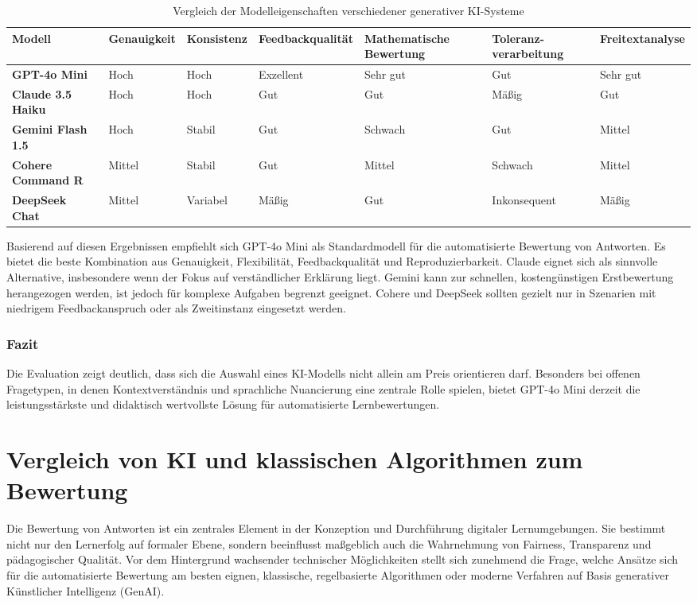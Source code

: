 \documentclass[a4paper,12pt]{article}
\begin{document}
\begin{table}[h!]
\centering
\scriptsize
\renewcommand{\arraystretch}{1.2}
\begin{tabularx}{\textwidth}{>{\bfseries}l p{1.5cm} p{1.4cm} p{2cm} p{1.8cm} p{1.7cm} p{2cm}}
\toprule
Modell & Genauigkeit & Konsistenz & Feedbackqualität & Mathematische Bewertung & Toleranz-verarbeitung & Freitextanalyse \\
\midrule
GPT-4o Mini & Hoch & Hoch & Exzellent & Sehr gut & Gut & Sehr gut \\
Claude 3.5 Haiku & Hoch & Hoch & Gut & Gut & Mäßig & Gut \\
Gemini Flash 1.5 & Hoch & Stabil & Gut & Schwach & Gut & Mittel \\
Cohere Command R & Mittel & Stabil & Gut & Mittel & Schwach & Mittel \\
DeepSeek Chat & Mittel & Variabel & Mäßig & Gut & Inkonsequent & Mäßig \\
\bottomrule
\end{tabularx}
\caption{Vergleich der Modelleigenschaften verschiedener generativer KI-Systeme}
\end{table}

Basierend auf diesen Ergebnissen empfiehlt sich GPT-4o Mini als Standardmodell für die automatisierte Bewertung von Antworten. Es bietet die beste Kombination aus Genauigkeit, Flexibilität, Feedbackqualität und Reproduzierbarkeit. Claude eignet sich als sinnvolle Alternative, insbesondere wenn der Fokus auf verständlicher Erklärung liegt. Gemini kann zur schnellen, kostengünstigen Erstbewertung herangezogen werden, ist jedoch für komplexe Aufgaben begrenzt geeignet. Cohere und DeepSeek sollten gezielt nur in Szenarien mit niedrigem Feedbackanspruch oder als Zweitinstanz eingesetzt werden.

\subsubsection{Fazit}

Die Evaluation zeigt deutlich, dass sich die Auswahl eines KI-Modells nicht allein am Preis orientieren darf. Besonders bei offenen Fragetypen, in denen Kontextverständnis und sprachliche Nuancierung eine zentrale Rolle spielen, bietet GPT-4o Mini derzeit die leistungsstärkste und didaktisch wertvollste Lösung für automatisierte Lernbewertungen.

\section{Vergleich von KI und klassischen Algorithmen zum Bewertung}
Die Bewertung von Antworten ist ein zentrales Element in der Konzeption und Durchführung digitaler Lernumgebungen. Sie bestimmt nicht nur den Lernerfolg auf formaler Ebene, sondern beeinflusst maßgeblich auch die Wahrnehmung von Fairness, Transparenz und pädagogischer Qualität. Vor dem Hintergrund wachsender technischer Möglichkeiten stellt sich zunehmend die Frage, welche Ansätze sich für die automatisierte Bewertung am besten eignen, klassische, regelbasierte Algorithmen oder moderne Verfahren auf Basis generativer Künstlicher Intelligenz (GenAI).
\end{document}
